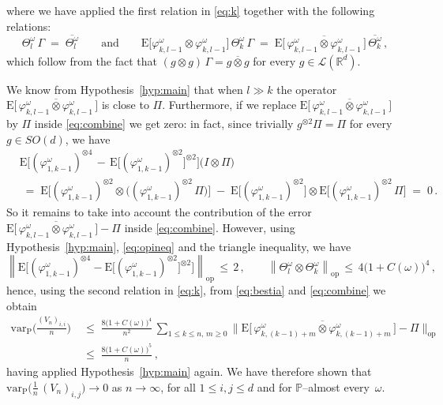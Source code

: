 \documentclass[a4paper,reqno,11pt]{amsart}
\numberwithin{equation}{section}
\newcommand{\bbP}{{\ensuremath{\mathbb P}} }
\newcommand{\cL}{{\ensuremath{\mathcal L}} }
\newcommand{\go}{\omega}
\newcommand{\R}{\mathbb{R}}
\def\bP{\ensuremath{\bs{\mathrm{P}}}}
\def\bE{\ensuremath{\bs{\mathrm{E}}}}
\def\bs{\boldsymbol}
\renewcommand{\phi}{\varphi}
\begin{document}
where we have applied the first relation in \eqref{eq:k} together with
the following relations:
\begin{equation}
	\Theta^\go_l \, \Gamma \;=\; \overline{\Theta^\go_l} \qquad \text{and} \qquad
	\bE\big[ \phi_{k,l-1}^\go \otimes \phi_{k,l-1}^\go \big] \, \Theta^\go_k \, \Gamma
	\;=\; \bE\big[\, \overline{\phi_{k,l-1}^\go \otimes \phi_{k,l-1}^\go} \, \big] \,
	\overline{\Theta^\go_k} \,,
\end{equation}
which follow from the fact that $(g \otimes g) \, \Gamma = \overline{g \otimes g}$
for every $g \in \cL(\R^d)$.


We know from Hypothesis~\ref{hyp:main} that when $l \gg k$ the operator
$\bE\big[\, \overline{\phi_{k,l-1}^\go \otimes \phi_{k,l-1}^\go} \, \big]$ is close to $\Pi$.
Furthermore, if we replace $\bE\big[\, \overline{\phi_{k,l-1}^\go \otimes \phi_{k,l-1}^\go} \, \big]$
by $\Pi$ inside \eqref{eq:combine} we get zero: in fact, since trivially
$g^{\otimes 2} \Pi = \Pi$ for every $g \in SO(d)$, we have
\begin{equation}
\begin{split}
	&\bE \Big[(\phi_{1,k-1}^\go)^{\otimes 4} \, - \,
	\bE \big[ (\phi_{1,k-1}^\go)^{\otimes 2} \big]^{\otimes 2} \Big]
	\big( I \otimes \Pi \big)\\
	& \;=\; \bE \big[(\phi_{1,k-1}^\go)^{\otimes 2} \otimes
	\big( (\phi_{1,k-1}^\go)^{\otimes 2}\, \Pi \big) \big] \; - \;
	\bE \big[ (\phi_{1,k-1}^\go)^{\otimes 2} \big] \otimes
	\bE \big[ (\phi_{1,k-1}^\go)^{\otimes 2} \, \Pi \big] \; =\; 0 \,.
\end{split}
\end{equation}
So it remains to take into account the contribution of the error
$\bE\big[ \, \overline{\phi_{k,l-1}^\go \otimes \phi_{k,l-1}^\go} \, \big] - \Pi$
inside \eqref{eq:combine}.
However, using Hypothesis~\ref{hyp:main}, \eqref{eq:opineq} and the triangle inequality,
we have
\begin{equation}
	\left\|
	\bE \Big[(\phi_{1,k-1}^\go)^{\otimes 4} -
	\bE \big[ (\phi_{1,k-1}^\go)^{\otimes 2} \big]^{\otimes 2} \Big]
	\right\|_{\text{op}} \, \le \, 2 \,, \qquad
	\left\|\Theta^\go_l \otimes \Theta^\go_k\right\|_{\text{op}}
	\, \le \, 4 \big(1+C(\go)\big)^4 \,,
\end{equation}
hence, using the second relation
in \eqref{eq:k}, from \eqref{eq:bestia} and \eqref{eq:combine} we obtain
\begin{equation}
\begin{split}
	\mathrm{var}_{\bP} \bigg( \frac{(V_n)_{i,i}}{n} \bigg)
	& \;\le\; \frac{8 \big(1+C(\go)\big)^4}{n^2} \,
	\sum_{1 \le k \le n , \, m \ge 0} \big\|
	\bE\big[ \, \overline{\phi_{k,(k-1)+m}^\go \otimes \phi_{k,(k-1)+m}^\go} \, \big] - \Pi
	\big\|_{\text{op}}\\
	& \;\le\; \frac{8 \big(1+C(\go)\big)^5}{n} \,,
\end{split}
\end{equation}
having applied Hypothesis~\ref{hyp:main} again.
We have therefore shown that
$\mathrm{var}_{\bP} \big( \frac 1n \, (V_n)_{i,j} \big) \to 0$ as $n \to\infty$,
for all $1 \le i,j \le d$ and for $\bbP$--almost every~$\go$.
\end{document}
